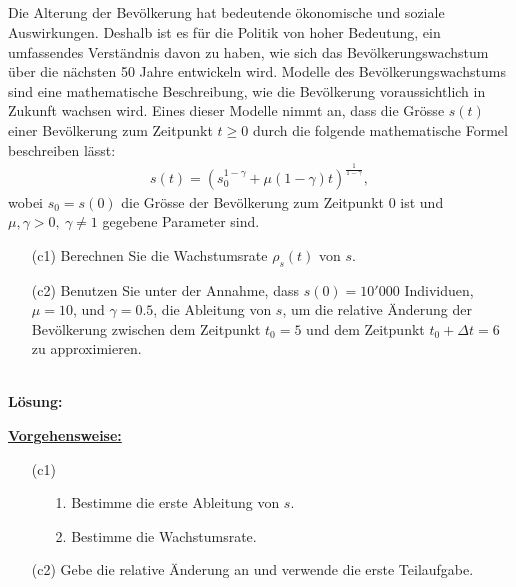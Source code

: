 \subsection*{}
Die Alterung der Bevölkerung hat bedeutende ökonomische und soziale Auswirkungen. Deshalb ist es für die Politik von hoher Bedeutung, ein umfassendes Verständnis davon zu haben, wie sich das Bevölkerungswachstum über die nächsten 50 Jahre entwickeln wird.
Modelle des Bevölkerungswachstums sind eine mathematische Beschreibung, wie die Bevölkerung voraussichtlich in Zukunft wachsen wird.
Eines dieser Modelle nimmt an, dass die Grösse $s(t)$ einer Bevölkerung zum Zeitpunkt $t \geq 0$ durch die folgende mathematische Formel beschreiben lässt:
\begin{align*}
	s(t)
	=
	\left(s_0^{1- \gamma} + \mu (1 - \gamma)  t \right)^{\frac{1}{1- \gamma}},
\end{align*}
wobei $s_0 = s(0)$ die Grösse der Bevölkerung zum Zeitpunkt $0$ ist und $\mu, \gamma > 0, \ \gamma \neq 1$ gegebene Parameter sind.
\begin{enumerate}
	\item[(c1)] Berechnen Sie die Wachstumsrate $ \rho_s(t) $ von $ s $.
	\item[(c2)] Benutzen Sie unter der Annahme, dass $s(0) = 10'000 $ Individuen, $\mu = 10$, und $\gamma = 0.5$, die Ableitung von $s$, um die relative Änderung der Bevölkerung zwischen dem Zeitpunkt $t_0 = 5 $ und dem Zeitpunkt $t_0 + \Delta t = 6$ zu approximieren.
\end{enumerate}
\ \\
\textbf{Lösung:}
\begin{mdframed}
\underline{\textbf{Vorgehensweise:}}
\begin{enumerate}
\item[(c1)] 
\begin{enumerate}
	\item[1.] Bestimme die erste Ableitung von $s$.
	\item[2.] Bestimme die Wachstumsrate.
\end{enumerate}
\item[(c2)] Gebe die relative Änderung an und verwende die erste Teilaufgabe.
\end{enumerate}
\end{mdframed}


